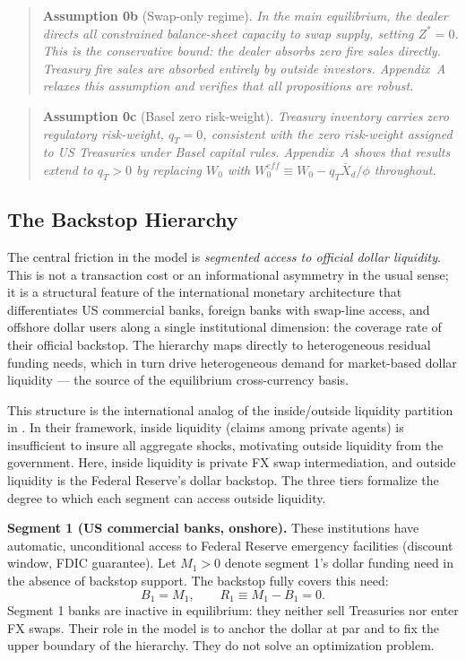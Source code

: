 \begin{quote}
\textbf{Assumption 0b} (Swap-only regime). \textit{In the main equilibrium, the dealer directs
all constrained balance-sheet capacity to swap supply, setting $Z^* = 0$. This is the conservative
bound: the dealer absorbs zero fire sales directly. Treasury fire sales are absorbed entirely by
outside investors. Appendix~A relaxes this assumption and verifies that all propositions are
robust.}
\end{quote}

\begin{quote}
\textbf{Assumption 0c} (Basel zero risk-weight). \textit{Treasury inventory carries zero
regulatory risk-weight, $q_T = 0$, consistent with the zero risk-weight assigned to US Treasuries
under Basel capital rules. Appendix~A shows that results extend to $q_T > 0$ by replacing $W_0$
with $W_0^{eff} \equiv W_0 - q_T\bar{X}_d/\phi$ throughout.}
\end{quote}

\subsection{The Backstop Hierarchy}
\label{subsec:hierarchy}

The central friction in the model is \textit{segmented access to official dollar liquidity}. This
is not a transaction cost or an informational asymmetry in the usual sense; it is a structural
feature of the international monetary architecture that differentiates US commercial banks, foreign
banks with swap-line access, and offshore dollar users along a single institutional dimension: the
coverage rate of their official backstop. The hierarchy maps directly to heterogeneous residual
funding needs, which in turn drive heterogeneous demand for market-based dollar liquidity — the
source of the equilibrium cross-currency basis.

This structure is the international analog of the inside/outside liquidity partition in
\citet{HolmstromTirole1998}. In their framework, inside liquidity (claims among private agents)
is insufficient to insure all aggregate shocks, motivating outside liquidity from the government.
Here, inside liquidity is private FX swap intermediation, and outside liquidity is the Federal
Reserve's dollar backstop. The three tiers formalize the degree to which each segment can access
outside liquidity.

\textbf{Segment 1 (US commercial banks, onshore).} These institutions have automatic,
unconditional access to Federal Reserve emergency facilities (discount window, FDIC guarantee).
Let $M_1 > 0$ denote segment 1's dollar funding need in the absence of backstop support. The
backstop fully covers this need:
\begin{equation}
  B_1 = M_1, \qquad R_1 \equiv M_1 - B_1 = 0.
  \label{eq:seg1}
\end{equation}
Segment 1 banks are inactive in equilibrium: they neither sell Treasuries nor enter FX swaps.
Their role in the model is to anchor the dollar at par and to fix the upper boundary of the
hierarchy. They do not solve an optimization problem.

